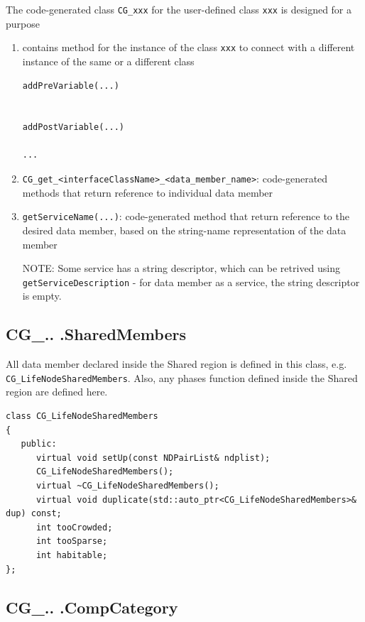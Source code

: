 The code-generated class \verb!CG_xxx! for the user-defined class \verb!xxx! is designed for a purpose
\begin{enumerate}
  \item contains method for the instance of the class \verb!xxx! to connect with a different instance of the same or a different class
  
  
\begin{verbatim}
addPreVariable(...)


addPostVariable(...)

...
\end{verbatim}


  \item \verb!CG_get_<interfaceClassName>_<data_member_name>!: code-generated
  methods that return reference to individual data member
  
  \item \verb!getServiceName(...)!: code-generated method that return reference
  to the desired data member, based on the string-name representation of the
  data member
  
  NOTE: Some service has a string descriptor, which can be retrived using
  \verb!getServiceDescription! - for data member as a service, the string
  descriptor is empty.
  
\end{enumerate}


\subsection{CG\_.. .SharedMembers}
\label{sec:CG_xxxSharedMembers}

All data member declared inside the Shared region is defined in this class,
e.g. \verb!CG_LifeNodeSharedMembers!.
Also, any phases function defined inside the Shared region are defined here.

\begin{lstlisting}
class CG_LifeNodeSharedMembers
{
   public:
      virtual void setUp(const NDPairList& ndplist);
      CG_LifeNodeSharedMembers();
      virtual ~CG_LifeNodeSharedMembers();
      virtual void duplicate(std::auto_ptr<CG_LifeNodeSharedMembers>& dup) const;
      int tooCrowded;
      int tooSparse;
      int habitable;
};
\end{lstlisting}

\subsection{CG\_.. .CompCategory}
\label{sec:CG_xxxCompCategory}
\label{sec:CG_xxxCompCategory::setDistributionTemplates()}

